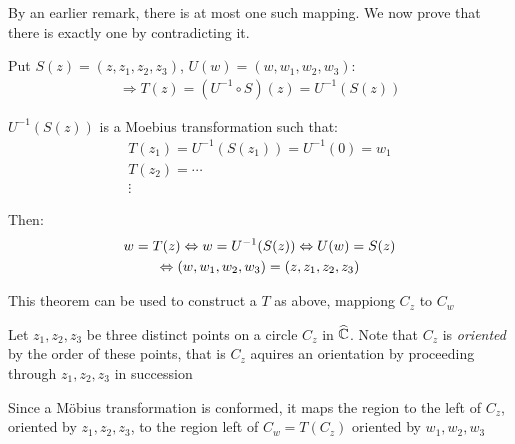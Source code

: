 \par\bigskip
\begin{prf}[]{}
  By an earlier remark, there is at most one such mapping. We now prove that there is exactly one by contradicting it.
  \par\bigskip
  \noindent Put $S(z) = (z,z_1,z_2,z_3)$, $U(w) = (w,w_1,w_2,w_3)$:
  \begin{equation*}
    \begin{gathered}
      \Rightarrow T(z) = (U^{-1}\circ S)(z) = U^{-1}(S(z))
    \end{gathered}
  \end{equation*}\par
  \noindent $U^{-1}(S(z))$ is a Moebius transformation such that:
  \begin{equation*}
    \begin{gathered}
      T(z_1) = U^{-1}(S(z_1)) = U^{-1}(0) = w_1\\
      T(z_2)= \cdots\\
      \vdots
    \end{gathered}
  \end{equation*}
  \par
  \noindent Then:
  \begin{equation*}
    \begin{gathered}
      w = T(z) \Leftrightarrow w = U^{-1}(S(z))\Leftrightarrow U(w) =S(z)\\
      \Leftrightarrow (w,w_1,w_2,w_3) = (z,z_1,z_2,z_3)
    \end{gathered}
  \end{equation*}
\end{prf}
\par\bigskip
\noindent This theorem can be used to construct a $T$ as above, mappiong $C_z$ to $C_w$
\par\bigskip
\noindent Let $z_1,z_2,z_3$ be three distinct points on a circle $C_z$ in $\widehat{\mathbb{C}}$. Note that $C_z$ is \textit{oriented} by the order of these points, that is $C_z$ aquires an orientation by proceeding through $z_1,z_2,z_3$ in succession
\par\bigskip
\noindent Since a Möbius transformation is conformed, it maps the region to the left of $C_z$, oriented by $z_1,z_2,z_3$, to the region left of $C_w = T(C_z)$  oriented by $w_1,w_2,w_3$
\par\bigskip
